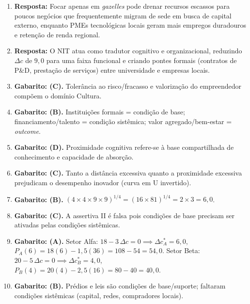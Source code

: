 \begin{boxGabarito}
\begin{enumerate}[leftmargin=1.6em, itemsep=4pt]
  \item \textbf{Resposta:} Focar apenas em \textit{gazelles} pode drenar recursos escassos para poucos negócios que frequentemente migram de sede em busca de capital externo, enquanto PMEs tecnológicas locais geram mais empregos duradouros e retenção de renda regional.
  \item \textbf{Resposta:} O NIT atua como tradutor cognitivo e organizacional, reduzindo $\Delta c$ de $9{,}0$ para uma faixa funcional e criando pontes formais (contratos de P\&D, prestação de serviços) entre universidade e empresas locais.
  \item \textbf{Gabarito: (C).} Tolerância ao risco/fracasso e valorização do empreendedor compõem o domínio Cultura.
  \item \textbf{Gabarito: (B).} Instituições formais = condição de base; financiamento/talento = condição sistêmica; valor agregado/bem-estar = \textit{outcome}.
  \item \textbf{Gabarito: (D).} Proximidade cognitiva refere-se à base compartilhada de conhecimento e capacidade de absorção.
  \item \textbf{Gabarito: (C).} Tanto a distância excessiva quanto a proximidade excessiva prejudicam o desempenho inovador (curva em U invertido).
  \item \textbf{Gabarito: (B).} $(4 \times 4 \times 9 \times 9)^{1/4} = (16 \times 81)^{1/4} = 2 \times 3 = 6{,}0$.
  \item \textbf{Gabarito: (C).} A assertiva II é falsa pois condições de base precisam ser ativadas pelas condições sistêmicas.
  \item \textbf{Gabarito: (A).} Setor Alfa: $18 - 3\,\Delta c = 0 \implies \Delta c_A^* = 6{,}0$, $P_A(6) = 18(6) - 1{,}5(36) = 108 - 54 = 54{,}0$. Setor Beta: $20 - 5\,\Delta c = 0 \implies \Delta c_B^* = 4{,}0$, $P_B(4) = 20(4) - 2{,}5(16) = 80 - 40 = 40{,}0$.
  \item \textbf{Gabarito: (B).} Prédios e leis são condições de base/suporte; faltaram condições sistêmicas (capital, redes, compradores locais).
\end{enumerate}
\end{boxGabarito}

